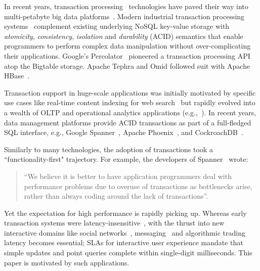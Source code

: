 In recent years, transaction processing~\cite{Gray:1992:TPC:573304} technologies have paved their way into multi-petabyte big data 
platforms~\cite{Percolator2010,Spanner2012,Omid2017}. 
Modern industrial transaction processing systems~\cite{Percolator2010, Omid2017, tephra, cockroach} complement 
existing underlying NoSQL key-value storage with {\em atomicity}, {\em consistency}, {\em isolation\/} and {\em durability} (ACID) 
semantics that enable programmers to perform complex data manipulation without over-complicating their applications. 
Google's Percolator~\cite{Percolator2010} pioneered a transaction processing API atop the Bigtable storage. Apache 
Tephra and Omid followed suit with Apache HBase~\cite{hbase}. 

Transaction support in huge-scale applications was initially motivated by specific use cases like real-time content indexing for 
web search~\cite{Percolator2010, Omid2017} but  rapidly evolved into a wealth of OLTP and operational analytics 
applications (e.g.,~\cite{Borthakur:2011, F1-2013}). In recent years, data management platforms provide ACID transactions as part of a full-fledged 
SQL interface, e.g., Google Spanner~\cite{Spanner2012}, Apache Phoenix~\cite{phoenix}, and CockroachDB~\cite{cockroach}. 

Similarly to many technologies, the adoption of transactions took a  ``functionality-first" trajectory. 
For example, the developers of Spanner~\cite{Spanner2012} wrote:
\begin{quote}
  ``We believe it
is better to have application programmers deal with performance problems due to overuse 
of transactions as bottlenecks arise, rather than always coding around the lack of transactions''. 
\end{quote}
Yet the expectation for high performance is rapidly picking up. 
Whereas early transaction systems were  latency-insensitive~\cite{Percolator2010, Omid2017}, 
with the thrust into new interactive domains like 
social networks~\cite{chatter},  %
messaging~\cite{Borthakur:2011} and algorithmic trading~\cite{opentsdb} 
latency becomes essential;   
SLAs for interactive user experience
mandate that simple updates and point queries  complete within single-digit milliseconds. 
This paper is motivated by such  applications.

